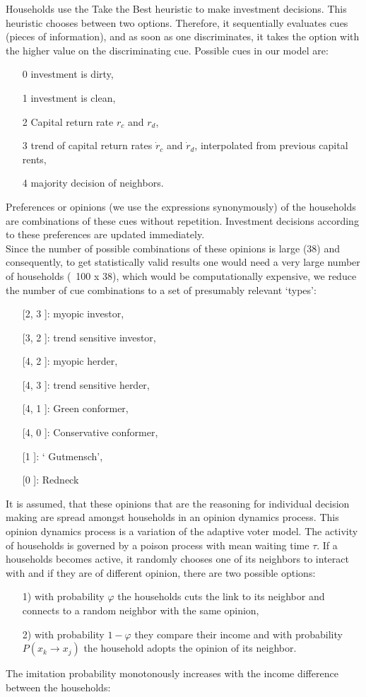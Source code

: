 Households use the Take the Best heuristic to make investment decisions. This heuristic chooses between two options. Therefore, it sequentially evaluates cues (pieces of information), and as soon as one discriminates, it takes the option with the higher value on the discriminating cue. Possible cues in our model are:
\begin{itemize}
	\item[0] investment is dirty,
	\item[1] investment is clean,
	\item[2] Capital return rate $r_c$ and $r_d$,	
	\item[3] trend of capital return rates $\dot{r}_c$ and $\dot{r}_d$, interpolated from previous capital rents,
	\item[4] majority decision of neighbors.
\end{itemize}
Preferences or opinions (we use the expressions synonymously) of the households are combinations of these cues without repetition. Investment decisions according to these preferences are updated immediately. \\
Since the number of possible combinations of these opinions is large (38) and consequently, to get statistically valid results one would need a very large number of households (~100 x 38), which would be computationally expensive, we reduce the number of cue combinations to a set of presumably relevant `types':
\begin{itemize}
	\item [[2, 3]]: myopic investor,
	\item [[3, 2]]: trend sensitive investor,
	\item [[4, 2]]: myopic herder,
	\item [[4, 3]]: trend sensitive herder,
	\item [[4, 1]]: Green conformer,
	\item [[4, 0]]: Conservative conformer,
	\item [[1]]: ` Gutmensch',
	\item [[0]]: Redneck
\end{itemize}
It is assumed, that these opinions that are the reasoning for individual decision making are spread amongst households in an opinion dynamics process. This opinion dynamics process is a variation of the adaptive voter model. The activity of households is governed by a poison process with mean waiting time $\tau$. If a households becomes active, it randomly chooses one of its neighbors to interact with and if they are of different opinion, there are two possible options:
\begin{itemize}
	\item [1)] with probability $\varphi$ the households cuts the link to its neighbor and connects to a random neighbor with the same opinion,
	\item [2)] with probability $1-\varphi$ they compare their income and with probability $P(x_k \rightarrow x_j)$ the household adopts the opinion of its neighbor.
\end{itemize}
The imitation probability monotonously increases with the income difference between the households: 

